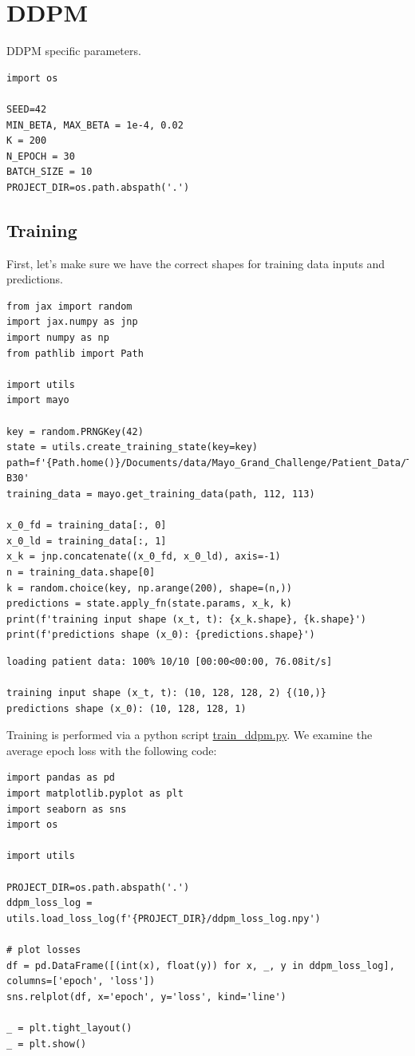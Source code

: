 \documentclass[a4paper, 11pt]{article}
\begin{document}
\section{DDPM}
\label{sec:org5dc078a}
DDPM specific parameters.
\begin{verbatim}
import os

SEED=42
MIN_BETA, MAX_BETA = 1e-4, 0.02
K = 200
N_EPOCH = 30
BATCH_SIZE = 10
PROJECT_DIR=os.path.abspath('.')
\end{verbatim}

\subsection{Training}
\label{sec:orgea2114b}
First, let's make sure we have the correct shapes for training data inputs and predictions.
\begin{verbatim}
from jax import random
import jax.numpy as jnp
import numpy as np
from pathlib import Path

import utils
import mayo

key = random.PRNGKey(42)
state = utils.create_training_state(key=key)
path=f'{Path.home()}/Documents/data/Mayo_Grand_Challenge/Patient_Data/Training_Image_Data/3mm B30'
training_data = mayo.get_training_data(path, 112, 113)

x_0_fd = training_data[:, 0]
x_0_ld = training_data[:, 1]
x_k = jnp.concatenate((x_0_fd, x_0_ld), axis=-1)
n = training_data.shape[0]
k = random.choice(key, np.arange(200), shape=(n,))
predictions = state.apply_fn(state.params, x_k, k)
print(f'training input shape (x_t, t): {x_k.shape}, {k.shape}')
print(f'predictions shape (x_0): {predictions.shape}')
\end{verbatim}

\begin{verbatim}
loading patient data: 100% 10/10 [00:00<00:00, 76.08it/s]

training input shape (x_t, t): (10, 128, 128, 2) {(10,)}
predictions shape (x_0): (10, 128, 128, 1)
\end{verbatim}

Training is performed via a python script \url{train\_ddpm.py}. We examine the average epoch loss with the following code:
\begin{verbatim}
import pandas as pd
import matplotlib.pyplot as plt
import seaborn as sns
import os

import utils

PROJECT_DIR=os.path.abspath('.')
ddpm_loss_log = utils.load_loss_log(f'{PROJECT_DIR}/ddpm_loss_log.npy')

# plot losses
df = pd.DataFrame([(int(x), float(y)) for x, _, y in ddpm_loss_log], columns=['epoch', 'loss'])
sns.relplot(df, x='epoch', y='loss', kind='line')

_ = plt.tight_layout()
_ = plt.show()
\end{verbatim}
\end{document}
